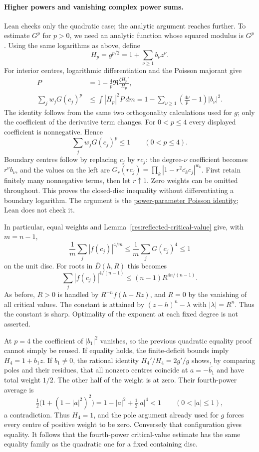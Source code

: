 \paragraph{Higher powers and vanishing complex power sums.}
Lean checks only the quadratic case; the analytic argument reaches
further. To estimate $G^p$ for $p>0$, we need an
analytic function whose squared modulus is $G^p$. Using the same
logarithms as above, define
\[
 H_p=g^{p/2}=1+\sum_{\nu\ge1}b_\nu z^\nu.
\]
For interior centres, logarithmic differentiation and the Poisson
majorant give
\begin{align*}
 P&=1-\frac4p\Re\frac{\zeta H_p'}{H_p},\\
 \sum_jw_jG(c_j)^p
 &\le\int |H_p|^2P\,dm
 =1-\sum_{\nu\ge1}\left(\frac{4\nu}{p}-1\right)|b_\nu|^2.
\end{align*}
The identity follows from the same two orthogonality calculations used
for $g$; only the coefficient of the derivative term changes. For
$0<p\le4$ every displayed coefficient is nonnegative. Hence
\[
 \sum_jw_jG(c_j)^p\le1\qquad(0<p\le4).
\]
Boundary centres follow by replacing $c_j$ by $rc_j$: the degree-$\nu$
coefficient becomes $r^\nu b_\nu$, and the values on the left are
$G_r(rc_j)=\prod_k|1-r^2\overline{c_k}c_j|^{w_k}$.
First retain finitely many nonnegative terms, then let $r\uparrow1$.
Zero weights can be omitted throughout. This proves the closed-disc
inequality without differentiating a boundary logarithm. The argument
is the
\href{https://github.com/wcook04/plectis-erdos/blob/f36a98bf3d3e6f65f1074e3b800e3293d5b8a51a/ErdosProblems/Erdos1041/SharpPowerDiscProducts.md}{power-parameter Poisson identity};
Lean does not check it.

In particular, equal weights and Lemma~\ref{res:reflected-critical-value}
give, with $m=n-1$,
\[
 \frac1m\sum_j|f(c_j)|^{4/m}\le\frac1m\sum_jG(c_j)^4\le1
\]
on the unit disc. For roots in $\overline D(h,R)$ this becomes
\[
 \sum_j|f(c_j)|^{4/(n-1)}\le(n-1)R^{4n/(n-1)}.
\]
As before, $R>0$ is handled by $R^{-n}f(h+Rz)$, and $R=0$ by the
vanishing of all critical values. The constant is attained by
$(z-h)^n-\lambda$ with $|\lambda|=R^n$. Thus the constant is sharp. Optimality of the exponent at each fixed
degree is not asserted.

At $p=4$ the coefficient of $|b_1|^2$ vanishes, so the previous
quadratic equality proof cannot simply be reused. If equality holds,
the finite-deficit bounds imply $H_4=1+b_1z$. If $b_1\ne0$, the
rational identity $H_4'/H_4=2g'/g$ shows, by comparing poles and their
residues, that all nonzero centres coincide at $a=-\overline{b_1}$
and have total weight $1/2$. The other half of the weight is at zero.
Their fourth-power average is
\[
 \tfrac12\bigl(1+(1-|a|^2)^2\bigr)
 =1-|a|^2+\tfrac12|a|^4<1\qquad(0<|a|\le1),
\]
a contradiction. Thus $H_4=1$, and the pole argument already used for
$g$ forces every centre of positive weight to be zero. Conversely that
configuration gives equality. It follows that the fourth-power
critical-value estimate has the same equality family as the quadratic
one for a fixed containing disc.

